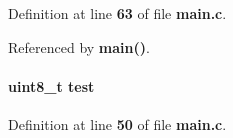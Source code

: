 Definition at line {\bf 63} of file {\bf main.\+c}.



Referenced by {\bf main()}.

\paragraph[{test}]{\setlength{\rightskip}{0pt plus 5cm}uint8\+\_\+t test}\label{main_8c_a9f66cfa89489c3be09541452b307d5cb}


Definition at line {\bf 50} of file {\bf main.\+c}.

